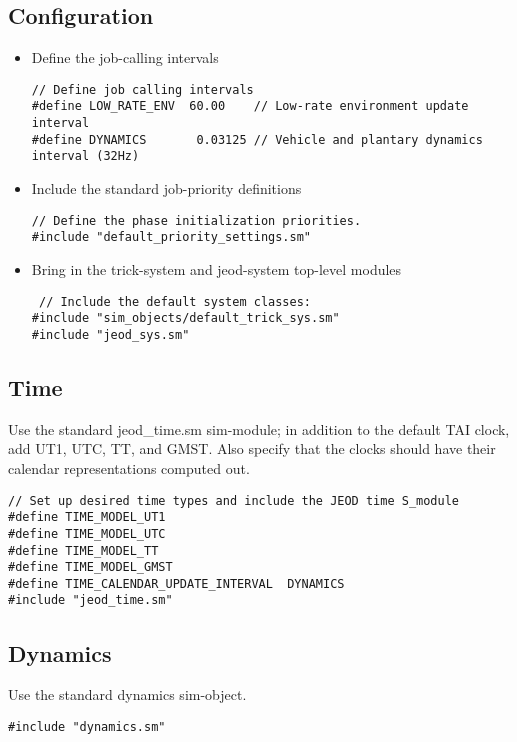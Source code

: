 \documentclass[twoside,11pt,titlepage]{report}
\begin{document}
\subsection{Configuration}
\begin{itemize}
\item Define the job-calling intervals

\begin{verbatim}
// Define job calling intervals
#define LOW_RATE_ENV  60.00    // Low-rate environment update interval
#define DYNAMICS       0.03125 // Vehicle and plantary dynamics interval (32Hz)
\end{verbatim}

\item Include the standard job-priority definitions

\begin{verbatim}
// Define the phase initialization priorities.
#include "default_priority_settings.sm"
\end{verbatim}

\item Bring in the trick-system and jeod-system top-level modules

\begin{verbatim}
 // Include the default system classes:
#include "sim_objects/default_trick_sys.sm"
#include "jeod_sys.sm"
\end{verbatim}

\end{itemize}

\subsection{Time}
Use the standard jeod\_time.sm sim-module; in addition to the default TAI
clock, add UT1, UTC, TT, and GMST.  Also specify that the clocks should have
their calendar representations computed out.

\begin{verbatim}
// Set up desired time types and include the JEOD time S_module
#define TIME_MODEL_UT1
#define TIME_MODEL_UTC
#define TIME_MODEL_TT
#define TIME_MODEL_GMST
#define TIME_CALENDAR_UPDATE_INTERVAL  DYNAMICS
#include "jeod_time.sm"
\end{verbatim}

\subsection{Dynamics}
Use the standard dynamics sim-object.
\begin{verbatim}
#include "dynamics.sm"
\end{verbatim}
\end{document}

